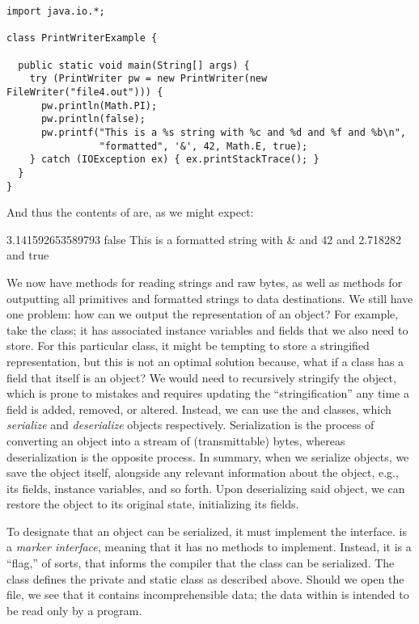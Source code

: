 
\begin{lstlisting}[language=MyJava]
import java.io.*;

class PrintWriterExample {
  
  public static void main(String[] args) {
    try (PrintWriter pw = new PrintWriter(new FileWriter("file4.out"))) {
      pw.println(Math.PI);
      pw.println(false);
      pw.printf("This is a %s string with %c and %d and %f and %b\n", 
                "formatted", '&', 42, Math.E, true);
    } catch (IOException ex) { ex.printStackTrace(); }
  }
}
\end{lstlisting}

And thus the contents of  are, as we might expect:

\begin{verbnobox}[\small]
3.141592653589793
false
This is a formatted string with & and 42 and 2.718282 and true
\end{verbnobox}

We now have methods for reading strings and raw bytes, as well as methods for outputting all primitives and formatted strings to data destinations.
We still have one problem: how can we output the representation of an object? For example, take the  class; it has associated instance variables and fields that we also need to store. 
For this particular class, it might be tempting to store a stringified representation, but this is not an optimal solution because, what if a class has a field that itself is an object? 
We would need to recursively stringify the object, which is prone to mistakes and requires updating the ``stringification'' any time a field is added, removed, or altered. 
Instead, we can use the  and  classes, which \emph{serialize} and \emph{deserialize} objects respectively. 
Serialization is the process of converting an object into a stream of (transmittable) bytes, whereas deserialization is the opposite process. 
In summary, when we serialize objects, we save the object itself, alongside any relevant information about the object, e.g., its fields, instance variables, and so forth. 
Upon deserializing said object, we can restore the object to its original state, initializing its fields.

To designate that an object can be serialized, it must implement the  interface. 
 is a \emph{marker interface}, meaning that it has no methods to implement. 
Instead, it is a ``flag,'' of sorts, that informs the compiler that the class can be serialized. 
The  class defines the private and static  class as described above. 
Should we open the  file, we see that it contains incomprehensible data; the data within is intended to be read only by a program.

